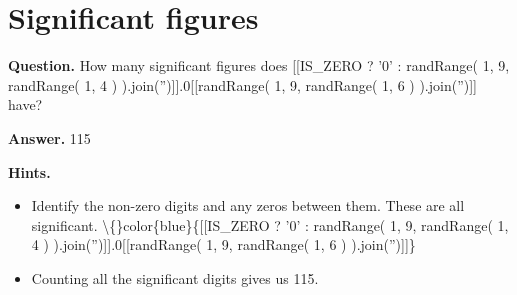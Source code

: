 \documentclass{article}
\begin{document}
\section*{Significant figures}
\textbf{Question.} How many significant figures does [[IS\_ZERO ? '0' : randRange( 1, 9, randRange( 1, 4 ) ).join('')]].0[[randRange( 1, 9, randRange( 1, 6 ) ).join('')]] have?

\textbf{Answer.} 115

\textbf{Hints.}
\begin{itemize}
  \item Identify the non-zero digits and any zeros between them. These are all significant.
            \textbackslash\{\}color\{blue\}\{[[IS\_ZERO ? '0' : randRange( 1, 9, randRange( 1, 4 ) ).join('')]].0[[randRange( 1, 9, randRange( 1, 6 ) ).join('')]]\}
  \item Counting all the significant digits gives us 115.
\end{itemize}
\end{document}
